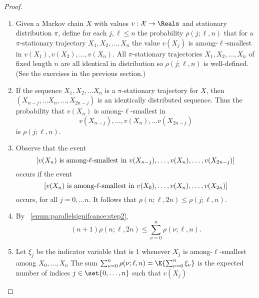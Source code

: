 \documentclass[12pt]{article}
\begin{document}
\begin{proof}
    \begin{enumerate}
        \item
            Given a Markov chain \( X \) with values \( v:  \mathcal{X}
            \to \Reals \) and stationary distribution \( \pi \), define
            for each \( j, \ell \le n \) the probability \( \rho(j; \ell,
            n) \) that for a \( \pi \)-stationary trajectory \( X_1, X_2,
            \dots, X_n \) the value \( v(X_j) \) is among-\( \ell \)-smallest
            in \( v(X_1), v(X_2), \dots, v(X_n) \).  All \( \pi \)-stationary
            trajectories \( X_1, X_2, \dots, X_n \) of fixed length \( n
            \) are all identical in distribution so \( \rho(j; \ell, n) \)
            is well-defined.  (See the exercises in the previous
            section.)
        \item
            If the sequence \( X_1, X_2, \dots X_n \) is a \( \pi \)-stationary
            trajectory for \( X \), then \( (X_{n-j}, \dots X_n, \dots,
            X_{2n-j}) \) is an identically distributed sequence.  Thus
            the probability that \( v(X_n) \) is among-\( \ell \)-smallest
            in
            \[
                v(X_{n-j}), \dots, v(X_n), \dots v(X_{2n-j})
            \] is \( \rho(j; \ell, n) \).
        \item
            \label{enum:parallelsignifcance:step2} Observe that the
            event
            \[
                [v(X_n) \text{ is among-\( \ell \)-smallest in } v(X_ {n-j}),
                \dots, v(X_n), \dots, v(X_{2n-j})]
            \] occurs if the event
            \[
                [v(X_n) \text{ is among-\( \ell \)-smallest in } v(X_0),
                \dots, v(X_n), \dots, v(X_{2n})]
            \] occurs, for all \( j = 0, \dots n \).  It follows that \(
            \rho(n; \ell, 2n) \le \rho(j; \ell, n) \).
        \item
            \label{enum:parallelsignifcance:step4} By~%
            \ref{enum:parallelsignifcance:step2},
            \[
                (n+1) \rho(n; \ell, 2n) \le \sum_{\nu=0}^n \rho(\nu;
                \ell, n).
            \]
        \item
            Let \( \xi_j \) be the indicator variable that is \( 1 \)
            whenever \( X_j \) is among-\( \ell \)-smallest among \( X_0,
            \dots , X_n \) The sum \( \sum_{\nu=0}^n \rho( \nu; \ell, n)
            = \E{\sum_{\nu=0}^n \xi_{\nu}} \) is the expected number of
            indices \( j \in \set{0, \dots, n} \) such that \( v(X_j) \)

\end{enumerate}
\end{proof}
\end{document}
